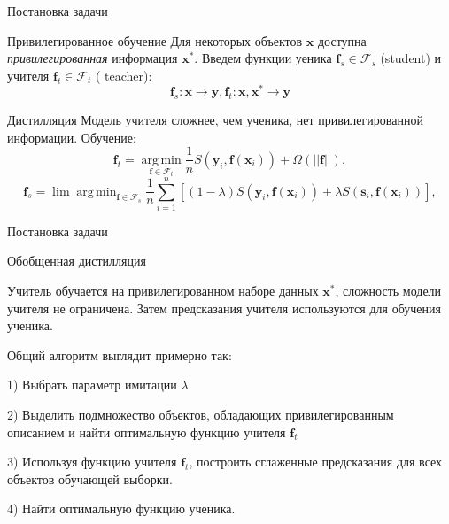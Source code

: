 \documentclass{beamer}
\DeclareMathOperator*{\argmin}{arg\,min}
\begin{document}
\begin{frame}{Постановка задачи}


 \begin{block}{Привилегированное обучение}
 Для некоторых объектов $\mathbf{x}$ доступна \emph{привилегированная} информация $\mathbf{x}^*$. Введем функции уеника $\mathbf{f}_s  \in \mathcal{F}_s$ (student) и учителя $\mathbf{f}_t \in \mathcal{F}_t$ ( teacher):
 $$ \mathbf{f}_s: \mathbf{x} \rightarrow \mathbf{y},   \mathbf{f}_t: \mathbf{x}, \mathbf{x}^* \rightarrow \mathbf{y}$$
 \end{block}

\begin{block}{Дистилляция}
Модель учителя сложнее, чем ученика, нет привилегированной информации.  Обучение:
$$ \mathbf{f}_t = \argmin\limits_{\mathbf{f} \in \mathcal{F}_t} \frac{1}{n} 
S (\mathbf{y}_i, \mathbf{f}(\mathbf{x}_i)) 
+ \Omega (|| \mathbf{f}||),
$$
$$ \mathbf{f}_s = \lim\argmin_{\mathbf{f} \in \mathcal{F}_s} \frac{1}{n} \sum\limits_{i=1}^n
\left[ (1 - \lambda) S (\mathbf{y}_i, \mathbf{f}(\mathbf{x}_i))  + 
 \lambda S (\mathbf{s}_i, \mathbf{f}(\mathbf{x}_i)) \right],$$
\end{block}

\end{frame}

\begin{frame}{Постановка задачи}

\begin{block}{Обобщенная дистилляция}

 Учитель обучается на  привилегированном наборе данных $\mathbf{x}^*$,  сложность модели учителя не ограничена.  Затем предсказания учителя используются для обучения ученика.

Общий алгоритм выглядит примерно так:

1) Выбрать параметр имитации $\lambda$.

2) Выделить подмножество объектов, обладающих привилегированным описанием и найти оптимальную функцию учителя $\mathbf{f}_t$

3) Используя функцию учителя $\mathbf{f}_t$, построить сглаженные предсказания для всех объектов обучающей выборки.

4) Найти оптимальную функцию ученика.

\end{block}

\end{frame}
\end{document}
